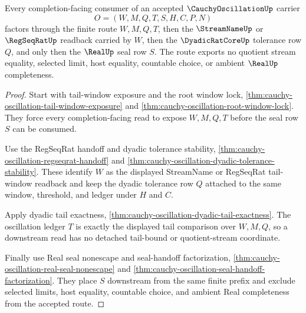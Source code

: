 \begin{theorem}
\label{thm:cauchy-oscillation-root-unblock-route}
Every completion-facing consumer of an accepted $\CauchyOscillationUp$ carrier
$$
O=(W,M,Q,T,S,H,C,P,N)
$$
factors through the finite route $W,M,Q,T$, then the $\StreamNameUp$ or $\RegSeqRatUp$ readback carried by $W$, then the $\DyadicRatCoreUp$ tolerance row $Q$, and only then the $\RealUp$ seal row $S$. The route exports no quotient stream equality, selected limit, host equality, countable choice, or ambient $\RealUp$ completeness.
\end{theorem}
\begin{proof}
Start with tail-window exposure and the root window lock, \autoref{thm:cauchy-oscillation-tail-window-exposure} and \autoref{thm:cauchy-oscillation-root-window-lock}. They force every completion-facing read to expose $W,M,Q,T$ before the seal row $S$ can be consumed.

Use the RegSeqRat handoff and dyadic tolerance stability, \autoref{thm:cauchy-oscillation-regseqrat-handoff} and \autoref{thm:cauchy-oscillation-dyadic-tolerance-stability}. These identify $W$ as the displayed StreamName or RegSeqRat tail-window readback and keep the dyadic tolerance row $Q$ attached to the same window, threshold, and ledger under $H$ and $C$.

Apply dyadic tail exactness, \autoref{thm:cauchy-oscillation-dyadic-tail-exactness}. The oscillation ledger $T$ is exactly the displayed tail comparison over $W,M,Q$, so a downstream read has no detached tail-bound or quotient-stream coordinate.

Finally use Real seal nonescape and seal-handoff factorization, \autoref{thm:cauchy-oscillation-real-seal-nonescape} and \autoref{thm:cauchy-oscillation-seal-handoff-factorization}. They place $S$ downstream from the same finite prefix and exclude selected limits, host equality, countable choice, and ambient Real completeness from the accepted route.
\end{proof}

